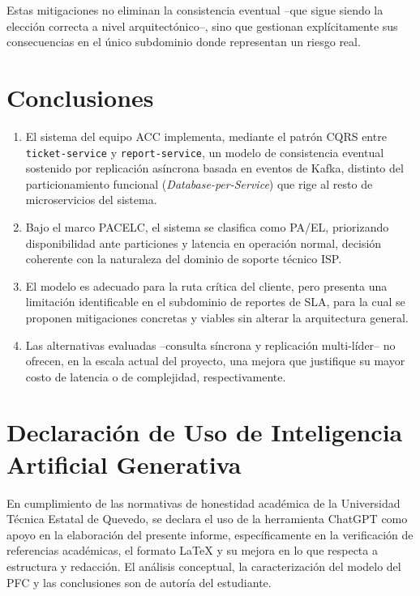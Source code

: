 \documentclass[12pt, a4paper]{article}
\begin{document}
Estas mitigaciones no eliminan la consistencia eventual --que sigue siendo la elección correcta a nivel arquitectónico--, sino que gestionan explícitamente sus consecuencias en el único subdominio donde representan un riesgo real.

\newpage
\section{Conclusiones}
\begin{enumerate}
    \item El sistema del equipo ACC implementa, mediante el patrón CQRS entre \texttt{ticket-service} y \texttt{report-service}, un modelo de consistencia eventual sostenido por replicación asíncrona basada en eventos de Kafka, distinto del particionamiento funcional (\textit{Database-per-Service}) que rige al resto de microservicios del sistema.
    \item Bajo el marco PACELC, el sistema se clasifica como PA/EL, priorizando disponibilidad ante particiones y latencia en operación normal, decisión coherente con la naturaleza del dominio de soporte técnico ISP.
    \item El modelo es adecuado para la ruta crítica del cliente, pero presenta una limitación identificable en el subdominio de reportes de SLA, para la cual se proponen mitigaciones concretas y viables sin alterar la arquitectura general.
    \item Las alternativas evaluadas --consulta síncrona y replicación multi-líder-- no ofrecen, en la escala actual del proyecto, una mejora que justifique su mayor costo de latencia o de complejidad, respectivamente.
\end{enumerate}

\section*{Declaración de Uso de Inteligencia Artificial Generativa}
En cumplimiento de las normativas de honestidad académica de la Universidad Técnica Estatal de Quevedo, se declara el uso de la herramienta ChatGPT como apoyo en la elaboración del presente informe, específicamente en la verificación de referencias académicas, el formato LaTeX y su mejora en lo que respecta a estructura y redacción. El análisis conceptual, la caracterización del modelo del PFC y las conclusiones son de autoría del estudiante.

\clearpage
\printbibliography[title={Referencias}]
\end{document}
